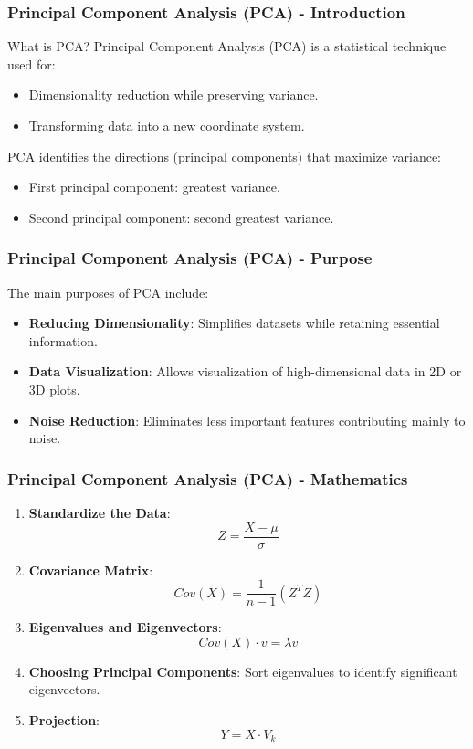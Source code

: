 \documentclass{beamer}
\begin{document}
\begin{frame}[fragile]
    \frametitle{Principal Component Analysis (PCA) - Introduction}
    \begin{block}{What is PCA?}
        Principal Component Analysis (PCA) is a statistical technique used for:
        \begin{itemize}
            \item Dimensionality reduction while preserving variance.
            \item Transforming data into a new coordinate system.
        \end{itemize}
    \end{block}
    PCA identifies the directions (principal components) that maximize variance:
    \begin{itemize}
        \item First principal component: greatest variance.
        \item Second principal component: second greatest variance.
    \end{itemize}
\end{frame}

\begin{frame}[fragile]
    \frametitle{Principal Component Analysis (PCA) - Purpose}
    The main purposes of PCA include:
    \begin{itemize}
        \item \textbf{Reducing Dimensionality}: Simplifies datasets while retaining essential information.
        \item \textbf{Data Visualization}: Allows visualization of high-dimensional data in 2D or 3D plots.
        \item \textbf{Noise Reduction}: Eliminates less important features contributing mainly to noise.
    \end{itemize}
\end{frame}

\begin{frame}[fragile]
    \frametitle{Principal Component Analysis (PCA) - Mathematics}
    \begin{enumerate}
        \item \textbf{Standardize the Data}:
        \[
        Z = \frac{X - \mu}{\sigma}
        \]

        \item \textbf{Covariance Matrix}:
        \[
        Cov(X) = \frac{1}{n-1} (Z^T Z)
        \]

        \item \textbf{Eigenvalues and Eigenvectors}:
        \[
        Cov(X) \cdot v = \lambda v
        \]

        \item \textbf{Choosing Principal Components}: Sort eigenvalues to identify significant eigenvectors.

        \item \textbf{Projection}:
        \[
        Y = X \cdot V_k
        \]
    \end{enumerate}
\end{frame}
\end{document}
